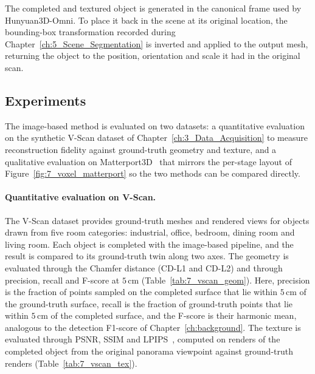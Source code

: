 The completed and textured object is generated in the canonical frame used by Hunyuan3D-Omni. To place it back in the scene at its original location, the bounding-box transformation recorded during Chapter~\ref{ch:5_Scene_Segmentation} is inverted and applied to the output mesh, returning the object to the position, orientation and scale it had in the original scan.


\subsection{Experiments}
\label{sec:7_image_exp}

The image-based method is evaluated on two datasets: a quantitative evaluation on the synthetic V-Scan dataset of Chapter~\ref{ch:3_Data_Acquisition} to measure reconstruction fidelity against ground-truth geometry and texture, and a qualitative evaluation on Matterport3D~\cite{chang_matterport3d_2017} that mirrors the per-stage layout of Figure~\ref{fig:7_voxel_matterport} so the two methods can be compared directly.


\paragraph{Quantitative evaluation on V-Scan.}
The V-Scan dataset provides ground-truth meshes and rendered views for objects drawn from five room categories: industrial, office, bedroom, dining room and living room. Each object is completed with the image-based pipeline, and the result is compared to its ground-truth twin along two axes. The geometry is evaluated through the Chamfer distance (\gls{CD-L1} and \gls{CD-L2}) and through precision, recall and F-score at $5$\,cm (Table~\ref{tab:7_vscan_geom}). Here, precision is the fraction of points sampled on the completed surface that lie within $5$\,cm of the ground-truth surface, recall is the fraction of ground-truth points that lie within $5$\,cm of the completed surface, and the F-score is their harmonic mean, analogous to the detection F1-score of Chapter~\ref{ch:background}. The texture is evaluated through PSNR, SSIM and LPIPS~\cite{zhang_unreasonable_2018}, computed on renders of the completed object from the original panorama viewpoint against ground-truth renders (Table~\ref{tab:7_vscan_tex}).

